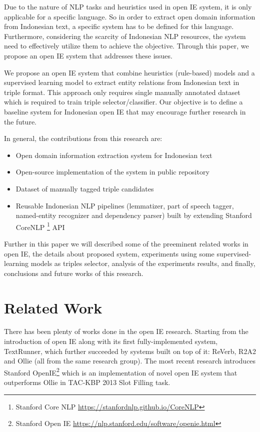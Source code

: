 \documentclass[conference,compsoc,12pt]{IEEEtran}
\begin{document}
Due to the nature of NLP tasks and heuristics used in open IE system, it is only applicable for a specific language\cite{banko2007open}. So in order to extract open domain information from Indonesian text, a specific system has to be defined for this language. Furthermore, considering the scarcity of Indonesian NLP resources, the system need to effectively utilize them to achieve the objective. Through this paper, we propose an open IE system that addresses these issues.

We propose an open IE system that combine heuristics (rule-based) models and a supervised learning model to extract entity relations from Indonesian text in triple format. This approach only requires single manually annotated dataset which is required to train triple selector/classifier. Our objective is to define a baseline system for Indonesian open IE that may encourage further research in the future.

In general, the contributions from this research are:

\begin{itemize}
\item Open domain information extraction system for Indonesian text
\item Open-source implementation of the system in public repository
\item Dataset of manually tagged triple candidates
\item Reusable Indonesian NLP pipelines (lemmatizer, part of speech tagger, named-entity recognizer and dependency parser) built by extending Stanford CoreNLP \footnote{Stanford Core NLP \url{https://stanfordnlp.github.io/CoreNLP}} API
\end{itemize}

Further in this paper we will described some of the preeminent related works in open IE, the details about proposed system, experiments using some supervised-learning models as triples selector, analysis of the experiments results, and finally, conclusions and future works of this research.

\section{Related Work}

There has been plenty of works done in the open IE research. Starting from the introduction of open IE along with its first fully-implemented system, TextRunner\cite{banko2007open}, which further succeeded by systems built on top of it: ReVerb, R2A2\cite{etzioni2011open} and Ollie\cite{schmitz2012open} (all from the same research group). The most recent research introduces Stanford OpenIE\footnote{Stanford Open IE \url{https://nlp.stanford.edu/software/openie.html}} which is an implementation of novel open IE system that outperforms Ollie in TAC-KBP
2013 Slot Filling task\cite{angeli2015leveraging}.
\end{document}
